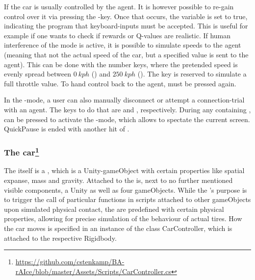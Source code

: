 If  the car is usually controlled by the agent. It is however possible to re-gain control over it via pressing the -key. Once that occurs, the variable  is set to true, indicating the program that keyboard-inputs must be accepted. This is useful for example if one wants to check if rewards or Q-values are realistic. If human interference of the  mode is active, it is possible to simulate speeds to the agent (meaning that not the actual speed of the car, but a specified value is sent to the agent). This can be done with the number keys, where the pretended speed is evenly spread between $0~ kph$ () and $250~ kph$ (). The  key is reserved to simulate a full throttle value. To hand control back to the agent,  must be pressed again. 

In the -mode, a user can also manually disconnect or attempt a connection-trial with an agent. The keys to do that are  and , respectively. During any  containing ,  can be pressed to activate the -mode, which allows to spectate the current screen. QuickPause is ended with another hit of . 

\subsubsection{The car\footnote{\url{https://github.com/cstenkamp/BA-rAIce/blob/master/Assets/Scripts/CarController.cs}}}

The  itself is a , which is a Unity-gameObject with certain properties like spatial expanse, mass and gravity. Attached to the  is, next to no further mentioned visible components, a Unity  as well as four  gameObjects. While the 's purpose is to trigger the call of particular functions in scripts attached to other gameObjects upon simulated physical contact, the  are predefined with certain physical properties, allowing for precise simulation of the behaviour of actual tires. How the car moves is specified in an instance of the class CarController, which is attached to the respective Rigidbody.

